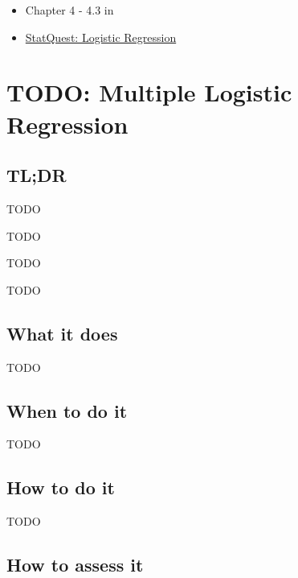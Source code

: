 \documentclass[
]{book}
\providecommand{\tightlist}{%
  \setlength{\itemsep}{0pt}\setlength{\parskip}{0pt}}
\begin{document}
\begin{itemize}
\tightlist
\item
  Chapter 4 - 4.3 in \citet{ISLR}
\item
  \href{https://www.youtube.com/watch?v=yIYKR4sgzI8}{StatQuest: Logistic Regression}
\end{itemize}

\hypertarget{multiple-logistic-regression}{%
\chapter{TODO: Multiple Logistic Regression}\label{multiple-logistic-regression}}

\hypertarget{tldr-3}{%
\section{TL;DR}\label{tldr-3}}

\begin{description}
\tightlist
\item[What it does]
TODO
\item[When to do it]
TODO
\item[How to do it]
TODO
\item[How to assess it]
TODO
\end{description}

\hypertarget{what-it-does-3}{%
\section{What it does}\label{what-it-does-3}}

TODO

\hypertarget{when-to-do-it-3}{%
\section{When to do it}\label{when-to-do-it-3}}

TODO

\hypertarget{how-to-do-it-3}{%
\section{How to do it}\label{how-to-do-it-3}}

TODO

\hypertarget{how-to-assess-it-3}{%
\section{How to assess it}\label{how-to-assess-it-3}}
\end{document}
